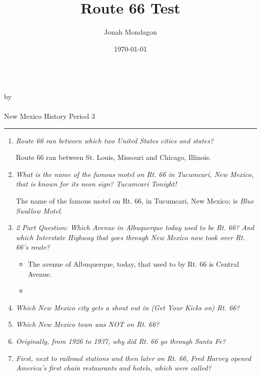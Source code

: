 \documentclass[12pt]{article}
\newcommand{\PutTitle}[1]
{
    \begin{center}
        {\huge\bfseries\thetitle}\\
        by \theauthor\\
        \thedate\\
        #1
    \end{center}
    \hrule
}
\begin{document}
\title{Route 66 Test}
\author{Jonah Mondagon}
\date{\today}
\PutTitle{New Mexico History Period 3}

\pagestyle{headings}

\doublespacing

\begin{enumerate}
    \item{\textit{Route 66 ran between which two United States cities and states?}}
        \begin{addmargin}[24pt]{0in}
            Route 66 ran between St. Louis, Missouri and Chicago, Illinois.
        \end{addmargin}
    \item{\textit{What is the name of the famous motel on Rt. 66 in Tucumcari, New Mexico, that is known for its neon sign? Tucumcari Tonight!}}
        \begin{addmargin}[24pt]{0in}
            The name of the famous motel on Rt. 66, in Tucumcari, New Mexico; is \textit{Blue Swallow Motel}.
        \end{addmargin}
    \item{\textit{2 Part Question: Which Avenue in Albuquerque today used to be Rt. 66? And which Interstate Highway that goes through New Mexico now took over Rt. 66's route?}}
        \begin{addmargin}[24pt]{0in}
            \begin{itemize}
                \item{The avenue of Albuquerque, today, that used to by Rt. 66 is Central Avenue.}
                \item{}
            \end{itemize}
        \end{addmargin}
    \item{\textit{Which New Mexico city gets a shout out in (Get Your Kicks on) Rt. 66?}}
        \begin{addmargin}[24pt]{0in}
        \end{addmargin}
    \item{\textit{Which New Mexico town was NOT on Rt. 66?}}
        \begin{addmargin}[24pt]{0in}
        \end{addmargin}
    \item{\textit{Originally, from 1926 to 1937, why did Rt. 66 go through Santa Fe?}}
        \begin{addmargin}[24pt]{0in}
        \end{addmargin}
    \item{\textit{First, next to railroad stations and then later on Rt. 66, Fred Harvey opened America's first chain restaurants and hotels, which were called?}}

\end{enumerate}
\end{document}
